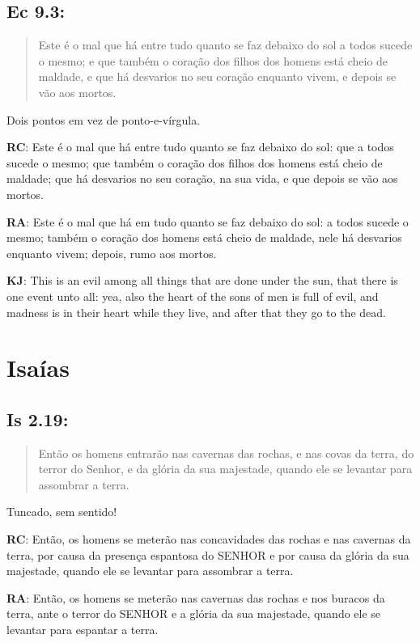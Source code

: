 \subsection*{Ec 9.3:} 
 \begin{quote} 
 Este é o mal que há entre tudo quanto se faz debaixo do sol\uwave{;} a todos sucede o mesmo; e que também o coração dos filhos dos homens está cheio de maldade, e que há desvarios no seu coração enquanto vivem, e depois se vão aos mortos.
 \end{quote}

Dois pontos em vez de ponto-e-vírgula.

\textbf{RC}: Este é o mal que há entre tudo quanto se faz debaixo do sol: que a todos sucede o mesmo; que também o coração dos filhos dos homens está cheio de maldade; que há desvarios no seu coração, na sua vida, e que depois se vão aos mortos.

\textbf{RA}: Este é o mal que há em tudo quanto se faz debaixo do sol: a todos sucede o mesmo; também o coração dos homens está cheio de maldade, nele há desvarios enquanto vivem; depois, rumo aos mortos.

\textbf{KJ}: This is an evil among all things that are done under the sun, that there is one event unto all: yea, also the heart of the sons of men is full of evil, and madness is in their heart while they live, and after that they go to the dead.

\section{Isaías}
\subsection*{Is 2.19:} 
 \begin{quote} 
 Então os homens entrarão nas cavernas das rochas, e nas covas da terra, do terror do Senhor, e da glória da sua majestade, quando ele se levantar para assombrar a terra.
 \end{quote}
 
Tuncado, sem sentido!

\textbf{RC}: Então, os homens se meterão nas concavidades das rochas e nas cavernas da terra, por causa da presença espantosa do SENHOR e por causa da glória da sua majestade, quando ele se levantar para assombrar a terra.

\textbf{RA}: Então, os homens se meterão nas cavernas das rochas e nos buracos da terra, ante o terror do SENHOR e a glória da sua majestade, quando ele se levantar para espantar a terra.

